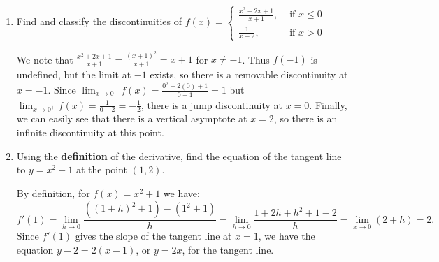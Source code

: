 \documentclass[12pt]{article}
\newcommand{\di}{\displaystyle}
\begin{document}
\begin{enumerate}
\item Find and classify the discontinuities of $\di f(x) = \begin{cases} \frac{x^2+2x+1}{x+1}, & \text{ if } x \leq 0\\ \frac{1}{x-2}, & \text{ if } x>0\end{cases}$

\medskip

We note that $\frac{x^2+2x+1}{x+1} = \frac{(x+1)^2}{x+1} = x+1$ for $x\neq -1$. Thus $f(-1)$ is undefined, but the limit at $-1$ exists, so there is a removable discontinuity at $x=-1$. Since $\lim_{x\to 0^-}f(x) = \frac{0^2+2(0)+1}{0+1} = 1$ but $\lim_{x\to 0^+}f(x) = \frac{1}{0-2} = -\frac{1}{2}$, there is a jump discontinuity at $x=0$. Finally, we can easily see that there is a vertical asymptote at $x=2$, so there is an infinite discontinuity at this point.

\medskip

\item Using the \textbf{definition} of the derivative, find the equation of the tangent line to $y=x^2+1$ at the point $(1,2)$.

\medskip

By definition, for $f(x)=x^2+1$ we have:
\[
 f'(1) = \lim_{h\to 0}\frac{((1+h)^2+1)-(1^2+1)}{h} = \lim_{h\to 0}\frac{1+2h+h^2+1-2}{h} = \lim_{x\to 0}(2+h) = 2.
\]
Since $f'(1)$ gives the slope of the tangent line at $x=1$, we have the equation $y-2 = 2(x-1)$, or $y=2x$, for the tangent line.
 \end{enumerate}
\end{document}
